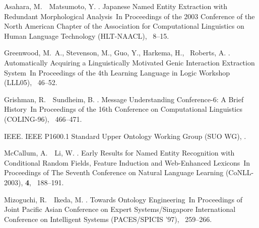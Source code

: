 \documentclass[japanese]{jnlp_1.4}
\begin{document}

\begin{thebibliography}{}

Asahara, M.\BBACOMMA\ \BBA\ Matsumoto, Y. \BBCP.
\newblock \BBOQ Japanese Named Entity Extraction with Redundant Morphological
  Analysis\BBCQ\
\newblock In {\Bem Proceedings of the 2003 Conference of the North American
  Chapter of the Association for Computational Linguistics on Human Language
  Technology (HLT-NAACL)}, \mbox{\BPGS\ 8--15}.

Greenwood, M.~A., Stevenson, M., Guo, Y., Harkema, H., \BBA\ Roberts, A. \BBOP
  2005\BBCP.
\newblock \BBOQ Automatically Acquiring a Linguistically Motivated Genic
  Interaction Extraction System\BBCQ\
\newblock In {\Bem Proceedings of the 4th Learning Language in Logic Workshop
  (LLL05)}, \mbox{\BPGS\ 46--52}.

Grishman, R.\BBACOMMA\ \BBA\ Sundheim, B. \BBOP 1996\BBCP.
\newblock \BBOQ Message Understanding Conference-6: A Brief History\BBCQ\
\newblock In {\Bem Proceedings of the 16th Conference on Computational
  Linguistics (COLING-96)}, \mbox{\BPGS\ 466--471}.

IEEE.
\newblock \BBOQ IEEE P1600.1 Standard Upper Ontology Working Group (SUO
  WG)\BBCQ, \Turl{http://suo.ieee.org/}.

McCallum, A.\BBACOMMA\ \BBA\ Li, W. \BBOP 2003\BBCP.
\newblock \BBOQ Early Results for Named Entity Recognition with Conditional
  Random Fields, Feature Induction and Web-Enhanced Lexicons\BBCQ\
\newblock In {\Bem Proceedings of The Seventh Conference on Natural Language
  Learning (CoNLL-2003), {\upshape\textbf{4}}}, \mbox{\BPGS\ 188--191}.

Mizoguchi, R.\BBACOMMA\ \BBA\ Ikeda, M. \BBCP.
\newblock \BBOQ Towards Ontology Engineering\BBCQ\
\newblock In {\Bem Proceedings of Joint Pacific Asian Conference on Expert
  Systems/Singapore International Conference on Intelligent Systems
  (PACES/SPICIS '97)}, \mbox{\BPGS\ 259--266}.


\end{thebibliography}
\end{document}
